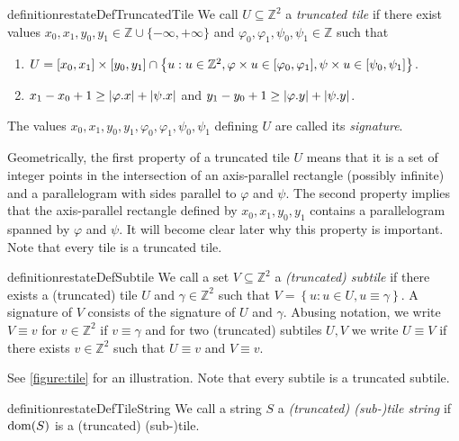 \documentclass[a4paper,11pt]{article}
\let\Cref\cref
\newcommand{\Z}{\mathbb{Z}}
\renewcommand{\phi}{\varphi}
\newcommand{\set}[1]{\left\lbrace #1 \right\rbrace}
\newcommand{\absolute}[1]{\left\lvert#1\right\rvert}
\begin{document}
\begin{restatable*}{definition}{restateDefTruncatedTile}
We call $U \subseteq \Z^2$ a \emph{truncated tile} if there exist values $x_0, x_1, y_0, y_1 \in \Z \cup \{-\infty, +\infty\}$ and $\phi_0, \phi_1, \psi_0, \psi_1 \in \Z$ such that 
	\begin{enumerate}
		\item $U = [x_0, x_1] \times [y_0, y_1] \cap \set{u : u \in \Z^2, \h{u} \in [\phi_0, \phi_1], \s{u} \in [\psi_0, \psi_1]}$. 
		\item $x_1 - x_0 + 1 \ge \absolute{\x{\phi}} + \absolute{\x{\psi}}$ and $y_1 - y_0 + 1 \ge \absolute{\y{\phi}} + \absolute{\y{\psi}}$. 
	\end{enumerate}
The values $x_0, x_1, y_0, y_1, \phi_0, \phi_1, \psi_0, \psi_1$ defining $U$ are called its \emph{signature}. 
\end{restatable*}

Geometrically, the first property of a truncated tile $U$ means that it is a set of integer points in the intersection of an axis-parallel rectangle (possibly infinite) and a parallelogram with sides parallel to $\phi$ and $\psi$. The second property implies that the axis-parallel rectangle defined by $x_0, x_1, y_0, y_1$ contains a parallelogram spanned by $\phi$ and $\psi$. It will become clear later why this property is important. 
Note that every tile is a truncated tile.

\begin{restatable*}[Subtile]{definition}{restateDefSubtile}\label{subtile_definition}
We call a set $V \subseteq \Z^2$ a \emph{(truncated) subtile} if there exists a (truncated) tile $U$ and $\gamma \in \Z^2$ such that $V = \set{u : u \in U, u \equiv \gamma}$. A signature of $V$ consists of the signature of $U$ and $\gamma$. Abusing notation, we write $V \equiv v$ for $v \in \Z^2$ if $v \equiv \gamma$ and for two (truncated) subtiles $U,V$ we write $U \equiv V$ if there exists $v \in \Z^2$ such that $U \equiv v$ and $V \equiv v$.
\end{restatable*}

See \Cref{figure:tile} for an illustration. Note that every subtile is a truncated subtile.

\begin{restatable*}{definition}{restateDefTileString}\label{tile_string_definition}
We call a string $S$ a \emph{(truncated) (sub-)tile string} if $\operatorname*{dom}(S)$ is a (truncated) (sub-)tile.
\end{restatable*}
\end{document}
